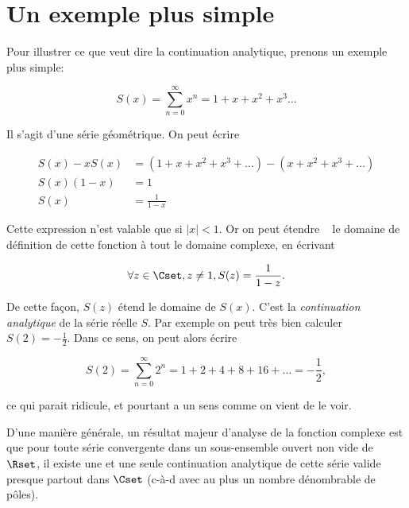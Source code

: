 \section{Un exemple plus simple}
Pour illustrer ce que veut dire la continuation analytique, prenons un exemple plus simple:

\begin{equation}
S(x) = \sum_{n=0}^\infty x^n = 1 + x + x^2 + x^3 \ldots
\end{equation}

Il s'agit d'une série géométrique. On peut écrire

\begin{align}
S(x) - x S(x) & = (1 + x + x^2 + x^3 + \ldots) - (x + x^2 + x^3 + \ldots) \\
S(x) (1 - x)  & = 1 \\
         S(x) & = \frac{1}{1-x} 
\end{align}

Cette expression n'est valable que si $|x| < 1$. Or on peut \og étendre \fg~ le domaine de définition de cette fonction à tout le domaine complexe, en écrivant

\begin{equation}
\forall z \in \Cset, z \neq 1, S(z) = \frac{1}{1-z}.
\end{equation}

De cette fa\c{c}on, $S(z)$ étend le domaine de $S(x)$. C'est la {\em continuation analytique} de la série réelle $S$. Par exemple on peut très bien calculer $S(2) = -\frac{1}{2}$. Dans ce sens, on peut alors écrire

\begin{equation}
S(2) = \sum_{n=0}^\infty 2^n = 1 + 2 + 4 + 8 + 16 + \ldots = -\frac{1}{2},
\end{equation}

ce qui parait ridicule, et pourtant a un sens comme on vient de le voir.

D'une manière générale, un résultat majeur d'analyse de la fonction complexe est que pour toute série convergente dans un sous-ensemble ouvert non vide de $\Rset$, il existe une et une seule continuation analytique de cette série valide presque partout dans $\Cset$ (c-à-d avec au plus un nombre dénombrable de pôles).